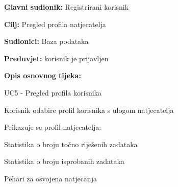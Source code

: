					
					\noindent {}
					\begin{packed_item}
						
						\item \textbf{Glavni sudionik: }Registrirani korisnik
						\item  \textbf{Cilj:} Pregled profila natjecatelja
						\item  \textbf{Sudionici:} Baza podataka
						\item  \textbf{Preduvjet: }korisnik je prijavljen
						\item  \textbf{Opis osnovnog tijeka:}
						
						\item[] \begin{packed_enum}
							
							\item UC5 - Pregled profila korisnika
							\item Korisnik odabire profil korisnika s ulogom natjecatelja
							\item Prikazuje se profil natjecatelja:
								\item[] \begin{packed_enum}
								\item Statistika o broju točno riješenih zadataka
								\item Statistika o broju isprobanih zadataka 
								\item Pehari za osvojena natjecanja
								
							\end{packed_enum}
						\end{packed_enum}
					\end{packed_item}
					
										
				
